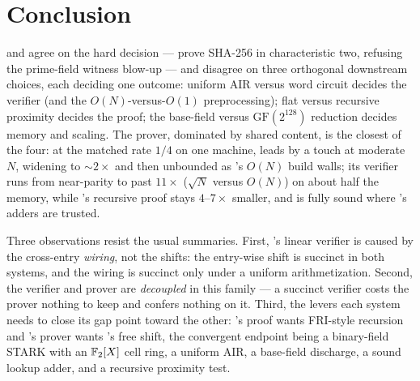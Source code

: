 \section{Conclusion}
\label{sec:conclusion}

\zinc{} and \binius{} agree on the hard decision --- prove SHA-256 in
characteristic two, refusing the prime-field witness blow-up --- and disagree
on three orthogonal downstream choices, each deciding one outcome: uniform AIR
versus word circuit decides the verifier (and the $O(N)$-versus-$O(1)$
preprocessing); flat versus recursive proximity decides the proof; the
base-field versus $\mathrm{GF}(2^{128})$ reduction decides memory and scaling.
The prover, dominated by shared content, is the closest of the four: at the
matched rate $1/4$ on one machine, \zinc{} leads by a touch at moderate $N$,
widening to $\sim$$2\times$ and then unbounded as \binius{}'s $O(N)$ build
walls; its verifier runs from near-parity to past $11\times$ ($\sqrt N$ versus
$O(N)$) on about half the memory, while \binius{}'s recursive proof stays
$4$--$7\times$ smaller, and \binius{} is fully sound where \zinc{}'s adders are
trusted.

Three observations resist the usual summaries. First, \binius{}'s linear
verifier is caused by the cross-entry \emph{wiring}, not the shifts: the
entry-wise shift is succinct in both systems, and the wiring is succinct only
under a uniform arithmetization. Second, the verifier and prover are
\emph{decoupled} in this family --- a succinct verifier costs the prover
nothing to keep and confers nothing on it. Third, the levers each system needs
to close its gap point toward the other: \zinc{}'s proof wants FRI-style
recursion and \binius{}'s prover wants \zinc{}'s free shift, the convergent
endpoint being a binary-field STARK with an $\mathbb{F}_2[X]$ cell ring, a uniform
AIR, a base-field discharge, a sound lookup adder, and a recursive proximity
test.
